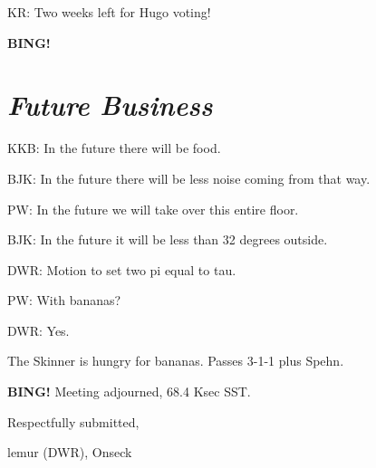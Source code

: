 \documentclass[10pt]{article}
\newcommand{\bing}{{\bf BING!} }
\newcommand{\goto}[1]{\bing \vskip 12pt \section*{{\em{#1}}}}
\newcommand{\ps}{ plus Spehn\xspace}
\newcommand{\onseck}{lemur (DWR), Onseck}
\begin{document}
KR: Two weeks left for Hugo voting!

\goto{Future Business}

KKB: In the future there will be food.

BJK: In the future there will be less noise coming from that way.

PW: In the future we will take over this entire floor.

BJK: In the future it will be less than 32 degrees outside.

DWR: Motion to set two pi equal to tau.

PW: With bananas?

DWR: Yes.

The Skinner is hungry for bananas.  Passes 3-1-1\ps.

\bing
\noindent
Meeting adjourned, 68.4 Ksec SST.

\vspace{18pt}

\centerline{Respectfully submitted,}
\centerline{\onseck}
\end{document}
